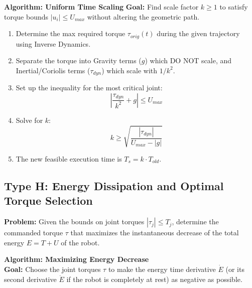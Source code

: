 \documentclass[11pt,a4paper]{article}
\begin{document}
 \textbf{Algorithm: Uniform Time Scaling}
\textbf{Goal:} Find scale factor $k \ge 1$ to satisfy torque bounds $|u_i| \le U_{max}$ without altering the geometric path.
\begin{enumerate}
    \item Determine the max required torque $\tau_{orig}(t)$ during the given trajectory using Inverse Dynamics.
    \item Separate the torque into Gravity terms ($g$) which DO NOT scale, and Inertial/Coriolis terms ($\tau_{dyn}$) which scale with $1/k^2$.
    \item Set up the inequality for the most critical joint:
    \begin{equation}
        \left| \frac{\tau_{dyn}}{k^2} + g \right| \leq U_{max}
    \end{equation}
    \item Solve for $k$:
    \begin{equation}
        k \geq \sqrt{\frac{|\tau_{dyn}|}{U_{max} - |g|}}
    \end{equation}
    \item The new feasible execution time is $T_s = k \cdot T_{old}$.
\end{enumerate}


\subsection{Type H: Energy Dissipation and Optimal Torque Selection}
\textbf{Problem:} Given the bounds on joint torques $|\tau_j| \le T_j$, determine the commanded torque $\tau$ that maximizes the instantaneous decrease of the total energy $E = T + U$ of the robot.

\textbf{Algorithm: Maximizing Energy Decrease} \\
\textbf{Goal:} Choose the joint torques $\tau$ to make the energy time derivative $\dot{E}$ (or its second derivative $\ddot{E}$ if the robot is completely at rest) as negative as possible.
\end{document}

